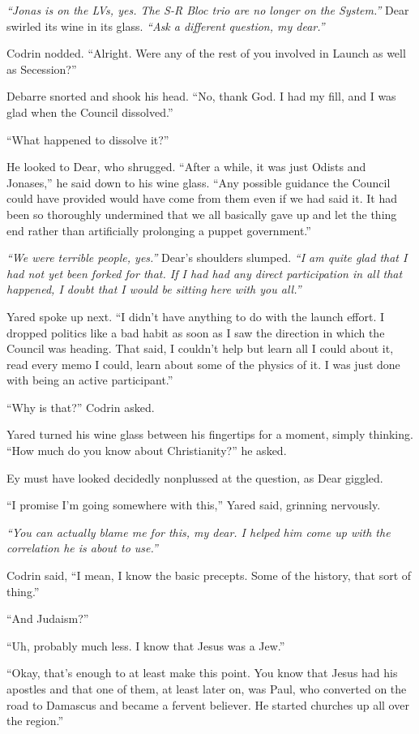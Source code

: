 \emph{``Jonas is on the LVs, yes. The S-R Bloc trio are no longer on the System.''} Dear swirled its wine in its glass. \emph{``Ask a different question, my dear.''}

Codrin nodded. ``Alright. Were any of the rest of you involved in Launch as well as Secession?''

Debarre snorted and shook his head. ``No, thank God. I had my fill, and I was glad when the Council dissolved.''

``What happened to dissolve it?''

He looked to Dear, who shrugged. ``After a while, it was just Odists and Jonases,'' he said down to his wine glass. ``Any possible guidance the Council could have provided would have come from them even if we had said it. It had been so thoroughly undermined that we all basically gave up and let the thing end rather than artificially prolonging a puppet government.''

\emph{``We were terrible people, yes.''} Dear's shoulders slumped. \emph{``I am quite glad that I had not yet been forked for that. If I had had any direct participation in all that happened, I doubt that I would be sitting here with you all.''}

Yared spoke up next. ``I didn't have anything to do with the launch effort. I dropped politics like a bad habit as soon as I saw the direction in which the Council was heading. That said, I couldn't help but learn all I could about it, read every memo I could, learn about some of the physics of it. I was just done with being an active participant.''

``Why is that?'' Codrin asked.

Yared turned his wine glass between his fingertips for a moment, simply thinking. ``How much do you know about Christianity?'' he asked.

Ey must have looked decidedly nonplussed at the question, as Dear giggled.

``I promise I'm going somewhere with this,'' Yared said, grinning nervously.

\emph{``You can actually blame me for this, my dear. I helped him come up with the correlation he is about to use.''}

Codrin said, ``I mean, I know the basic precepts. Some of the history, that sort of thing.''

``And Judaism?''

``Uh, probably much less. I know that Jesus was a Jew.''

``Okay, that's enough to at least make this point. You know that Jesus had his apostles and that one of them, at least later on, was Paul, who converted on the road to Damascus and became a fervent believer. He started churches up all over the region.''

